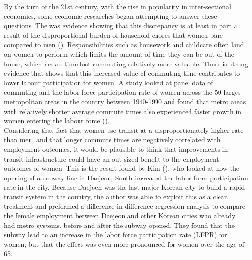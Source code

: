 \documentclass[A4paper,12pt]{article}
\begin{document}
By the turn of the 21st century, with the rise in popularity in inter-sectional economics, some economic researches began attempting to answer these questions. The was evidence showing that this discrepancy is at least in part a result of the disproportional burden of household chores that women bare compared to men (\cite{roberts_its_2011}). Responsibilities such as housework and childcare often land on women to perform which limits the amount of time they can be out of the house, which makes time lost commuting relatively more valuable. There is strong evidence that shows that this increased value of commuting time contributes to lower labour participation for women. A study looked at panel data of commuting and the labor force participation rate of women across the 50 larges metropolitan areas in the country between 1940-1990 and found that metro areas with relatively shorter average commute times also experienced faster growth in women entering the labour force (\cite{black_why_2014}).\\

Considering that fact that women use transit at a disproportionately higher rate than men, and that longer commute times are negatively correlated with employment outcomes, it would be plausible to think that improvements in transit infrastructure could have an out-sized benefit to the employment outcomes of women. This is the result found by Kim (\citeyear{kim_subways_2019}), who looked at how the opening of a subway line in Daejeon, South increased the labor force participation rate in the city. Because Daejoen was the last major Korean city to build a rapid transit system in the country, the author was able to exploit this as a clean treatment and preformed a difference-in-difference regression analysis to compare the female employment between Daejeon and other Korean cities who already had metro systems, before and after the subway opened. They found that the subway lead to an increase in the labor force participation rate (LFPR) for women, but that the effect was even more pronounced for women over the age of 65. \\
\end{document}
